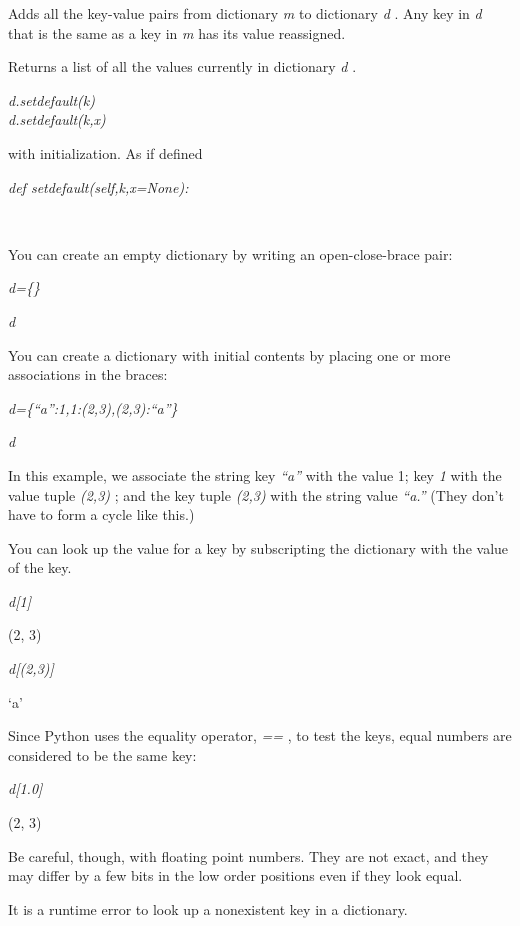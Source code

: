 Adds all the key-value pairs from
dictionary \emph{m} to dictionary \emph{d} . Any key in \emph{d} that is
the same as a key in \emph{m} has its value reassigned.



Returns a list of all the values
currently in dictionary \emph{d} .

 \emph{d.setdefault(k)\\
d.setdefault(k,x)}


with initialization. As if defined

 \emph{def
setdefault(self,k,x=None):}











~

You can create an empty dictionary
by writing an open-close-brace pair:


\emph{d=\{\}}


\emph{d}



You can create a dictionary with
initial contents by placing one or more associations in the braces:


\emph{d=\{``a'':1,1:(2,3),(2,3):``a''\}}


\emph{d}



In this example, we associate the
string key \emph{``a''} with the value 1; key \emph{1} with the value
tuple \emph{(2,3)} ; and the key tuple \emph{(2,3)} with the string
value \emph{``a.''} (They don't have to form a cycle like this.)

You can look up the value for a key
by subscripting the dictionary with the value of the key.


\emph{d{[}1{]}}

(2, 3)


\emph{d{[}(2,3){]}}

`a'

Since Python uses the equality
operator, \emph{==} , to test the keys, equal numbers are considered to
be the same key:


\emph{d{[}1.0{]}}

(2, 3)

Be careful, though, with floating
point numbers. They are not exact, and they may differ by a few bits in
the low order positions even if they look equal.

It is a runtime error to look up a
nonexistent key in a dictionary.


